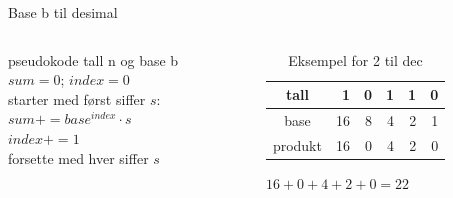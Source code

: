 \begin{frame}[fragile]{Base b til desimal}
\begin{columns}
    \begin{column}{0.30\textwidth}
\begin{block}{pseudokode}
    tall n og base b\\
    $sum=0$; $index=0$\\
    starter med først siffer $s$:\\
    $sum+=base^{index}\cdot s$\\
    $index+=1$\\
    forsette med hver siffer $s$
\end{block}
 	\end{column}
 	\pause
    \begin{column}{0.66\textwidth}
\begin{table}
\begin{tabular}{c|r|r|r|r|r}
    tall & 1 & 0 & 1 & 1 & 0 \\ \hline
    base & 16 & 8 & 4 & 2 & 1 \\ \hline
    produkt & 16 & 0 & 4 & 2 & 0 
\end{tabular}
\caption{Eksempel for 2 til dec}
\end{table}
\begin{center}
$16+0+4+2+0=22$    
\end{center}

 	\end{column}
 	\end{columns}
\end{frame}

